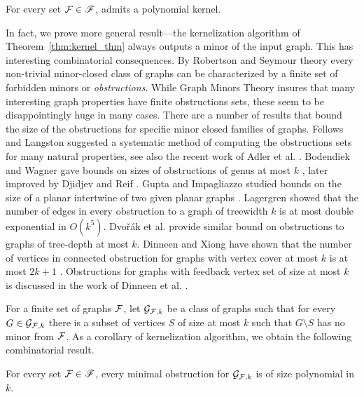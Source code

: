  \begin{theorem}\label{thm:kernel_thm}
 For every set  ${\cal F} \in \mathscr{F}$,  
\fd{} admits a polynomial kernel.
\end{theorem}

In fact, we prove  more general result---the kernelization algorithm of Theorem~\ref{thm:kernel_thm} always outputs a minor of the input graph. 
This has interesting combinatorial consequences. By Robertson and Seymour theory every non-trivial minor-closed class of graphs can be characterized by a finite set of  forbidden minors or \emph{obstructions}. 
While Graph Minors Theory insures that many interesting graph properties have finite obstructions sets, these seem to be disappointingly huge in many cases. 
There are a number of results that bound the size of the obstructions for specific minor closed families of graphs. Fellows and Langston \cite{FellowsL89_focs,FellowsL94}
suggested  a systematic method of computing the obstructions sets for many natural properties,  see also the recent work of Adler et al.  
\cite{AdlerGK08}.
 Bodendiek and Wagner  gave bounds on sizes of obstructions of genus at most $k$
\cite{BodendiekW89}, later improved by   Djidjev and   Reif
\cite{DjidjevR91}.  Gupta and Impagliazzo studied bounds     
on the size of a planar intertwine of two given planar graphs
 \cite{GuptaI91}. Lagergren \cite{Lagergren98} showed that the number of edges in every obstruction to a graph  of treewidth $k$ is at most double exponential in   $O(k^5)$.  
Dvo{\v{r}}{\'a}k et al.  \cite{Dvorak11} provide similar bound on obstructions to graphs of tree-depth at most $k$. Dinneen and  Xiong have shown that the number of vertices in connected  obstruction  for graphs with vertex cover at most  $k$  is at most  $2k+1$ \cite{Dinneen02VC}. Obstructions for graphs with feedback vertex set of size at most $k$ is discussed in the work of Dinneen et al. 
 \cite{DinneenCF01}.
 

For a finite set of graphs  $\cal{F}$, let ${\cal{G}}_{{\cal{F}},k}$ be a class of graphs such that for every $G\in {\cal{G}}_{{\cal{F}},k}$ there is a subset of vertices $S$ of size at most $k$ such that $G\setminus S$ has no minor from $\cal{F}$.  As a corollary of kernelization algorithm, we obtain the following combinatorial result.  
\begin{theorem}\label{thm:kernel_thm}
 For every set  ${\cal F} \in \mathscr{F}$,  
every minimal obstruction for   $ {\cal{G}}_{{\cal{F}},k}$ is of size  polynomial in $k$. 
\end{theorem}



